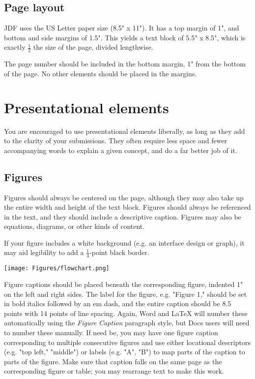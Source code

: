 \documentclass[
	letterpaper, %
]{jdf}
\begin{document}
\subsection{Page layout}
JDF uses the US Letter paper size (8.5" x 11"). It has a top margin of 1", and bottom and side margins of 1.5". This yields a text block of 5.5" x 8.5", which is 
exactly \(\frac{1}{2}\) the size of the page, divided lengthwise.

The page number should be included in the bottom margin, 1" from the bottom of the page. No other elements should be placed in the margins.

\section{Presentational elements}
You are encouraged to use presentational elements liberally, as long as they add to the clarity of your submissions. They often require less space and fewer accompanying 
words to explain a given concept, and do a far better job of it.

\subsection{Figures}
Figures should always be centered on the page, although they may also take up the entire width and height of the text block. Figures should always be referenced in the text, 
and they should include a descriptive caption. Figures may also be equations, diagrams, or other kinds of content.

If your figure includes a white background (e.g. an interface design or graph), it may aid legibility to add a \(\frac{1}{4}\)-point black border.

\begin{jdffigure}
\texttt{[image: Figures/flowchart.png]}%
\label{fig:flowchart}%
\end{jdffigure}

Figure captions should be placed beneath the corresponding figure, indented 1" on the left and right sides. The label for the figure, e.g. "Figure 1," should 
be set in bold italics followed by an em dash, and the entire caption should be 8.5 points with 14 points of line spacing. Again, Word and LaTeX will number 
these automatically using the \emph{Figure Caption} paragraph style, but Docs users will need to number these manually. If need be, you may have one figure caption 
corresponding to multiple consecutive figures and use either locational descriptors (e.g. "top left," "middle") or labels (e.g. "A", "B") to map parts of the caption 
to parts of the figure. Make sure that caption falls on the same page as the corresponding figure or table; you may rearrange text to make this work.
\end{document}
